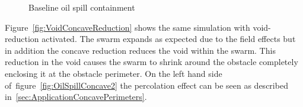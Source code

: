\begin{figure}[H]
\centering
{}
\caption{Baseline oil spill containment}
\label{fig:OilSpillConcaveReduction1}
\end{figure}

Figure~\ref{fig:VoidConcaveReduction} shows the same simulation with void-reduction activated. The swarm expands as expected due to the field effects but in addition the concave reduction reduces the void within the swarm. This reduction in the void causes the swarm to shrink around the obstacle completely enclosing it at the obstacle perimeter. On the left hand side of~figure~\ref{fig:OilSpillConcave2} the percolation effect can be seen as described in~\autoref{sec:ApplicationConcavePerimeters}.

